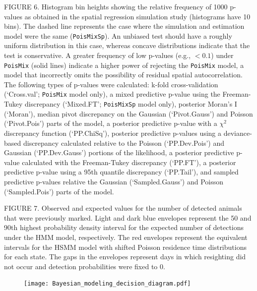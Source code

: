 \documentclass[12pt,english]{article}
\begin{document}
\begin{spacing}{1.9}
    FIGURE 6.  Histogram bin heights showing the relative frequency of
    1000 p-values as obtained in the spatial regression simulation
    study (histograms have 10 bins).  The dashed line represents the
    case where the simulation and estimation model were the same
    (\texttt{PoisMixSp}).  An unbiased test should have a roughly
    uniform distribution in this case, whereas concave distributions
    indicate that the test is conservative.  A greater frequency of
    low p-values (e.g., $<0.1$) under \texttt{PoisMix} (solid lines)
    indicate a higher power of rejecting the \texttt{PoisMix} model, a
    model that incorrectly omits the possibility of residual spatial
    autocorrelation.  The following types of p-values were calculated:
    k-fold cross-validation (`Cross.val'; \texttt{PoisMix} model
    only), a mixed predictive p-value using the Freeman-Tukey
    discrepancy (`Mixed.FT'; \texttt{PoisMixSp} model only), posterior
    Moran's I (`Moran'), median pivot discrepancy on the Gaussian
    (`Pivot.Gauss') and Poisson (`Pivot.Pois') parts of the model, a
    posterior predictive p-value with a $\chi^2$ discrepancy function
    (`PP.ChiSq'), posterior predictive p-values using a deviance-based
    discrepancy calculated relative to the Poisson (`PP.Dev.Pois') and
    Gaussian (`PP.Dev.Gauss') portions of the likelihood, a posterior
    predictive p-value calculated with the Freeman-Tukey discrepancy
    (`PP.FT'), a posterior predictive p-value using a 95th quantile
    discrepancy (`PP.Tail'), and sampled predictive p-values relative
    the Gaussian (`Sampled.Gauss') and Poisson (`Sampled.Pois') parts
    of the model.

    FIGURE 7. Observed and expected values for the number of detected animals that were previously marked. Light and dark blue envelopes represent the 50 and 90th highest probability density interval for the expected number of detections under the HMM model, respectively. The red envelopes represent the equivalent intervals for the HSMM model with shifted Poisson residence time distributions for each state. The gaps in the envelopes represent days in which resighting did not occur and detection probabilities were fixed to 0.


    \pagebreak

    \begin{figure}
      \begin{center}
        \texttt{[image: Bayesian\_modeling\_decision\_diagram.pdf]}
        \caption{} \label{fig:decision}
      \end{center}
    \end{figure}


\end{spacing}
\end{document}
